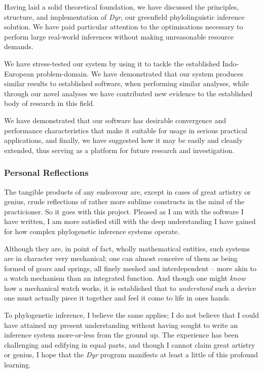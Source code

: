 \documentclass[10pt,journal,compsoc]{IEEEtran}
\begin{document}
Having laid a solid theoretical foundation, we have discussed the principles, structure, and implementation of \textit{Dyr}, our greenfield phylolinguistic inference solution. We have paid particular attention to the optimisations necessary to perform large real-world inferences without making unreasonable resource demands.

We have stress-tested our system by using it to tackle the established Indo-European problem-domain. We have demonstrated that our system produces similar results to established software, when performing similar analyses, while through our novel analyses we have contributed new evidence to the established body of research in this field.

We have demonstrated that our software has desirable convergence and performance characteristics that make it suitable for usage in serious practical applications, and finally, we have suggested how it may be easily and cleanly extended, thus serving as a platform for future research and investigation.

\subsubsection{Personal Reflections}

The tangible products of any endeavour are, except in cases of great artistry or genius, crude reflections of rather more sublime constructs in the mind of the practicioner. So it goes with this project. Pleased as I am with the software I have written, I am more satisfied still with the deep understanding I have gained for how complex phylogenetic inference systems operate.

Although they are, in point of fact, wholly mathematical entities, such systems are in character very mechanical; one can almost conceive of them as being formed of gears and springs, all finely meshed and interdependent -- more akin to a watch mechanism than an integrated function. And though one might \textit{know} how a mechanical watch works, it is established that to \textit{understand} such a device one must actually piece it together and feel it come to life in ones hands.

To phylogenetic inference, I believe the same applies; I do not believe that I could have attained my present understanding without having sought to write an inference system more-or-less from the ground up. The experience has been challenging and edifying in equal parts, and though I cannot claim great artistry or genius, I hope that the \textit{Dyr} program manifests at least a little of this profound learning.



\end{document}
